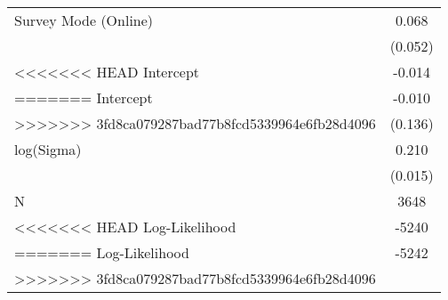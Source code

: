 \begin{table}[ht]
\begin{tabular}{lc}
  Survey Mode (Online) &  0.068 \\ 
   & (0.052) \\ 
<<<<<<< HEAD
  Intercept & -0.014 \\ 
=======
  Intercept & -0.010 \\ 
>>>>>>> 3fd8ca079287bad77b8fcd5339964e6fb28d4096
   & (0.136) \\ 
  log(Sigma) &  0.210 \\ 
   & (0.015) \\ 
   \hline
N & 3648 \\ 
<<<<<<< HEAD
  Log-Likelihood & -5240 \\ 
=======
  Log-Likelihood & -5242 \\ 
>>>>>>> 3fd8ca079287bad77b8fcd5339964e6fb28d4096
   \hline
\end{tabular}
\endgroup
\end{table}

